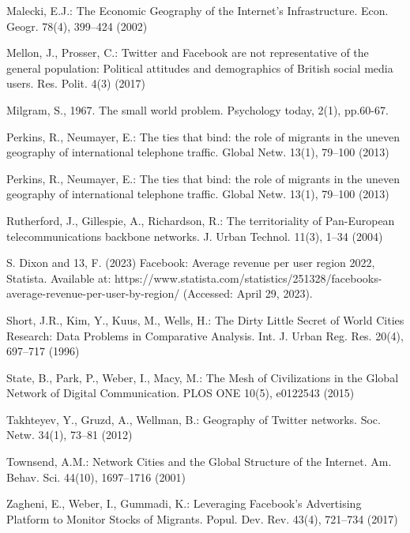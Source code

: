 \documentclass[12pt]{article}
\begin{document}
Malecki, E.J.: The Economic Geography of the Internet’s Infrastructure. Econ. Geogr. 78(4), 399–424 (2002)
\newline

Mellon, J., Prosser, C.: Twitter and Facebook are not representative of the general population: Political attitudes and demographics of British social media users. Res. Polit. 4(3) (2017)
\newline

Milgram, S., 1967. The small world problem. Psychology today, 2(1), pp.60-67.
\newline

Perkins, R., Neumayer, E.: The ties that bind: the role of migrants in the uneven geography of international telephone traffic. Global Netw. 13(1), 79–100 (2013)
\newline

Perkins, R., Neumayer, E.: The ties that bind: the role of migrants in the uneven geography of international telephone traffic. Global Netw. 13(1), 79–100 (2013)
\newline

Rutherford, J., Gillespie, A., Richardson, R.: The territoriality of Pan-European telecommunications backbone networks. J. Urban Technol. 11(3), 1–34 (2004)
\newline

S. Dixon and 13, F. (2023) Facebook: Average revenue per user region 2022, Statista. Available at: https://www.statista.com/statistics/251328/facebooks-average-revenue-per-user-by-region/ (Accessed: April 29, 2023). 
\newline

Short, J.R., Kim, Y., Kuus, M., Wells, H.: The Dirty Little Secret of World Cities Research: Data Problems in Comparative Analysis. Int. J. Urban Reg. Res. 20(4), 697–717 (1996)
\newline

State, B., Park, P., Weber, I., Macy, M.: The Mesh of Civilizations in the Global Network of Digital Communication. PLOS ONE 10(5), e0122543 (2015)
\newline

Takhteyev, Y., Gruzd, A., Wellman, B.: Geography of Twitter networks. Soc. Netw. 34(1), 73–81 (2012)
\newline

Townsend, A.M.: Network Cities and the Global Structure of the Internet. Am. Behav. Sci. 44(10), 1697–1716 (2001)
\newline

Zagheni, E., Weber, I., Gummadi, K.: Leveraging Facebook’s Advertising Platform to Monitor Stocks of Migrants. Popul. Dev. Rev. 43(4), 721–734 (2017)
\newline
\end{document}
